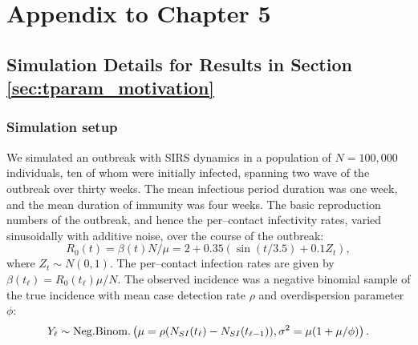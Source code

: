 \chapter{Appendix to Chapter 5}
\label{chap:appendix_ch5}

\section{Simulation Details for Results in Section \ref{sec:tparam_motivation}}
\label{sec:tparam_motiv_details}

\subsection{Simulation setup}
\label{subsec:tparam_motiv_setup}

We simulated an outbreak with SIRS dynamics in a population of $ N= 100,000$ individuals, ten of whom were initially infected, spanning two wave of the outbreak over thirty weeks. The mean infectious period duration was one week, and the mean duration of immunity was four weeks. The basic reproduction numbers of the outbreak, and hence the per--contact infectivity rates, varied sinusoidally with additive noise, over the course of the outbreak:
\begin{equation}
\label{eqn:sinfoi_true_R0t}
R_0(t) = \beta(t) N / \mu = 2 + 0.35(\sin(t / 3.5) + 0.1Z_t),
\end{equation} 
where $ Z_t \sim N(0,1)$.  The per--contact infection rates are given by $ \beta(t_\ell) = R_0(t_\ell) \mu / N $. The observed incidence was a negative binomial sample of the true incidence with mean case detection rate $ \rho $ and overdispersion parameter $ \phi $: 
\begin{equation}
Y_\ell \sim \mathrm{Neg.Binom.}\left (\mu  = \rho(N_{SI}(t_\ell) - N_{SI}(t_{\ell-1})), \sigma^2 = \mu(1 + \mu /\phi) \right ).
\end{equation}

